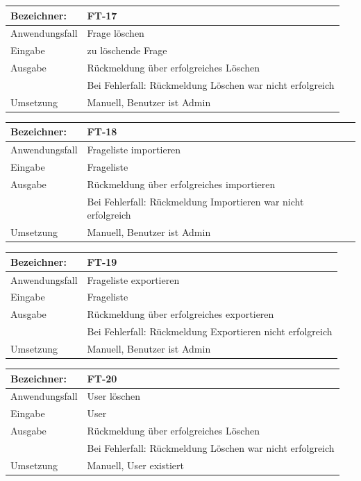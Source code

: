 \documentclass[fontsize=12pt,paper=a4,twoside]{scrartcl}
\begin{document}
\begin{tabular}{|l|p{13.75cm}|}
\hline
	Bezeichner: & FT-17\\
\hline
	Anwendungsfall & Frage löschen\\
\hline
	Eingabe & zu löschende Frage\\
\hline
	Ausgabe & Rückmeldung über erfolgreiches Löschen\\ &
	Bei Fehlerfall: Rückmeldung Löschen war nicht erfolgreich\\
\hline
	Umsetzung & Manuell, Benutzer ist Admin\\
\hline
\end{tabular}

\begin{tabular}{|l|p{13.75cm}|}
\hline
	Bezeichner: & FT-18\\
\hline
	Anwendungsfall & Frageliste importieren\\
\hline
	Eingabe & Frageliste\\
\hline
	Ausgabe & Rückmeldung über erfolgreiches importieren\\ &
	Bei Fehlerfall: Rückmeldung Importieren war nicht erfolgreich\\
\hline
	Umsetzung & Manuell, Benutzer ist Admin\\
\hline
\end{tabular}

\begin{tabular}{|l|p{13.75cm}|}
\hline
	Bezeichner: & FT-19\\
\hline
	Anwendungsfall & Frageliste exportieren\\
\hline
	Eingabe & Frageliste\\
\hline
	Ausgabe & Rückmeldung über erfolgreiches exportieren\\ &
	Bei Fehlerfall: Rückmeldung Exportieren nicht erfolgreich\\
\hline
	Umsetzung & Manuell, Benutzer ist Admin\\
\hline
\end{tabular}

\begin{tabular}{|l|p{13.75cm}|}
\hline
	Bezeichner: & FT-20\\
\hline
	Anwendungsfall & User löschen\\
\hline
	Eingabe & User\\
\hline
	Ausgabe & Rückmeldung über erfolgreiches Löschen\\ &
	Bei Fehlerfall: Rückmeldung Löschen war nicht erfolgreich\\
\hline
	Umsetzung & Manuell, User existiert\\
\hline
\end{tabular}
\end{document}
